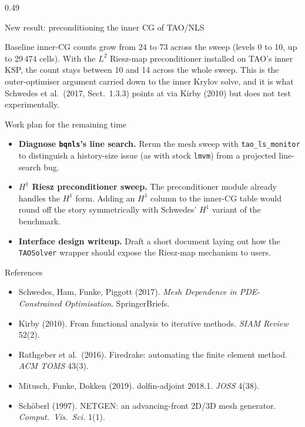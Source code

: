 \documentclass[final]{beamer}
\begin{document}
\begin{frame}[t]
\begin{columns}[t,totalwidth=\dimexpr\paperwidth-3cm\relax]
\begin{column}{0.49\dimexpr\paperwidth-3cm\relax}
\begin{alertblock}{New result: preconditioning the inner CG of TAO/NLS}
\vspace{0.2em}
\raggedright\small
Baseline inner-CG counts grow from 24 to 73 across the sweep (levels 0 to 10, up to 29\,474 cells). With the $L^{2}$ Riesz-map preconditioner installed on TAO's inner KSP, the count stays between 10 and 14 across the whole sweep. This is the outer-optimiser argument carried down to the inner Krylov solve, and it is what Schwedes et al.\ (2017, Sect.~1.3.3) points at via Kirby (2010) but does not test experimentally.
\end{alertblock}

\begin{block}{Work plan for the remaining time}
\begin{itemize}
\item \textbf{Diagnose \texttt{bqnls}'s line search.} Rerun the mesh sweep with \texttt{tao\_ls\_monitor} to distinguish a history-size issue (as with stock \texttt{lmvm}) from a projected line-search bug.
\item \textbf{$H^{1}$ Riesz preconditioner sweep.} The preconditioner module already handles the $H^{1}$ form. Adding an $H^{1}$ column to the inner-CG table would round off the story symmetrically with Schwedes' $H^{1}$ variant of the benchmark.
\item \textbf{Interface design writeup.} Draft a short document laying out how the \texttt{TAOSolver} wrapper should expose the Riesz-map mechanism to users.
\end{itemize}
\end{block}

\begin{block}{References}
\footnotesize
\begin{itemize}\itemsep0.1em
\item Schwedes, Ham, Funke, Piggott (2017). \textit{Mesh Dependence in PDE-Constrained Optimisation}. SpringerBriefs.
\item Kirby (2010). From functional analysis to iterative methods. \textit{SIAM Review} 52(2).
\item Rathgeber et al.\ (2016). Firedrake: automating the finite element method. \textit{ACM TOMS} 43(3).
\item Mitusch, Funke, Dokken (2019). dolfin-adjoint 2018.1. \textit{JOSS} 4(38).
\item Sch{\"o}berl (1997). NETGEN: an advancing-front 2D/3D mesh generator. \textit{Comput.\ Vis.\ Sci.} 1(1).
\end{itemize}
\end{block}


\end{column}
\end{columns}
\end{frame}
\end{document}
